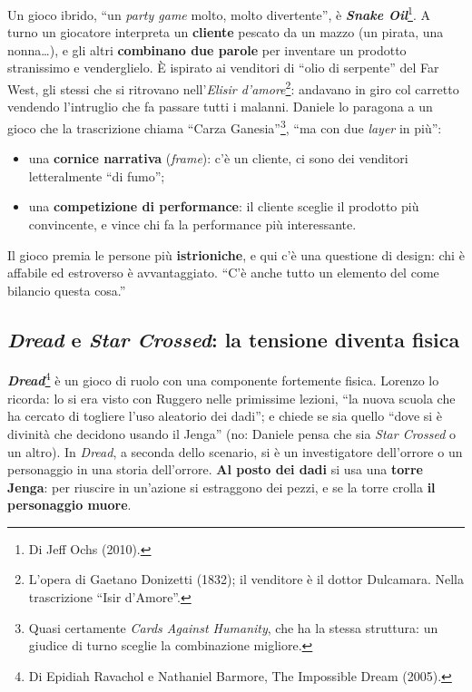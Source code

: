 

Un gioco ibrido, ``un \emph{party game} molto, molto divertente'', è \textbf{\emph{Snake
Oil}}\footnote{Di Jeff Ochs (2010).}. A turno un giocatore interpreta un \textbf{cliente}
pescato da un mazzo (un pirata, una nonna\ldots), e gli altri \textbf{combinano due parole} per
inventare un prodotto stranissimo e venderglielo. È ispirato ai venditori di ``olio di
serpente'' del Far West, gli stessi che si ritrovano nell'\emph{Elisir d'amore}\footnote{L'opera
di Gaetano Donizetti (1832); il venditore è il dottor Dulcamara. Nella trascrizione ``Isir
d'Amore''.}: andavano in giro col carretto vendendo l'intruglio che fa passare tutti i malanni.
Daniele lo paragona a un gioco che la trascrizione chiama ``Carza Ganesia''\footnote{Quasi
certamente \emph{Cards Against Humanity}, che ha la stessa struttura: un giudice di turno sceglie
la combinazione migliore.}, ``ma con due \emph{layer} in più'':
\begin{itemize}
  \item una \textbf{cornice narrativa} (\emph{frame}): c'è un cliente, ci sono dei venditori
        letteralmente ``di fumo'';
  \item una \textbf{competizione di performance}: il cliente sceglie il prodotto più
        convincente, e vince chi fa la performance più interessante.
\end{itemize}
Il gioco premia le persone più \textbf{istrioniche}, e qui c'è una questione di design: chi è
affabile ed estroverso è avvantaggiato. ``C'è anche tutto un elemento del come bilancio questa
cosa.''

\subsection{\emph{Dread} e \emph{Star Crossed}: la tensione diventa fisica}



\textbf{\emph{Dread}}\footnote{Di Epidiah Ravachol e Nathaniel Barmore, The Impossible Dream
(2005).} è un gioco di ruolo con una componente fortemente fisica. Lorenzo lo ricorda: lo si era
visto con Ruggero nelle primissime lezioni, ``la nuova scuola che ha cercato di togliere l'uso
aleatorio dei dadi''; e chiede se sia quello ``dove si è divinità che decidono usando il
Jenga'' (no: Daniele pensa che sia \emph{Star Crossed} o un altro). In \emph{Dread}, a seconda
dello scenario, si è un investigatore dell'orrore o un personaggio in una storia dell'orrore.
\textbf{Al posto dei dadi} si usa una \textbf{torre Jenga}: per riuscire in un'azione si
estraggono dei pezzi, e se la torre crolla \textbf{il personaggio muore}.

